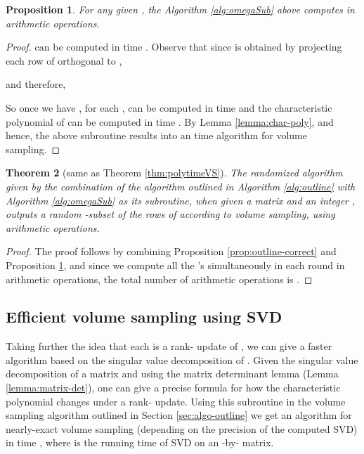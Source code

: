\documentclass[11pt]{article}
\newtheorem{theorem}{Theorem}
\newtheorem{prop}[theorem]{Proposition}
\begin{document}
\begin{prop} \label{prop:omegaVS}
For any given , the Algorithm \ref{alg:omegaSub} above computes  in  arithmetic operations.
\end{prop}
\begin{proof}
 can be computed in time . Observe that since  is obtained by projecting each row of  orthogonal to ,

and therefore,

So once we have , for each ,  can be computed in time  and the characteristic polynomial of  can be computed in time  \cite[Section 16.6]{ACT}. By Lemma \ref{lemma:char-poly},  and hence, the above subroutine results into an  time algorithm for volume sampling.
\end{proof}

\begin{theorem}[same as Theorem \ref{thm:polytimeVS}]
The randomized algorithm given by the combination of the algorithm outlined in Algorithm \ref{alg:outline} with Algorithm \ref{alg:omegaSub} as its subroutine, when given a matrix  and an integer , outputs a random -subset of the rows of  according to volume sampling, using  arithmetic operations.
\end{theorem}
\begin{proof}
The proof follows by combining Proposition \ref{prop:outline-correct} and Proposition \ref{prop:omegaVS}, and since we compute all the 's simultaneously in each round in  arithmetic operations, the total number of arithmetic operations is .
\end{proof}

\subsection{Efficient volume sampling using SVD} \label{subsec:svd}
Taking further the idea that each  is a rank- update of , we can give a faster algorithm based on the singular value decomposition of . Given the singular value decomposition of a matrix and using the matrix determinant lemma (Lemma \ref{lemma:matrix-det}), one can give a precise formula for how the characteristic polynomial changes under a rank- update. Using this subroutine in the volume sampling algorithm outlined in Section \ref{sec:algo-outline} we get an algorithm for nearly-exact volume sampling (depending on the precision of the computed SVD) in time , where  is the running time of SVD on an -by- matrix.
\end{document}
